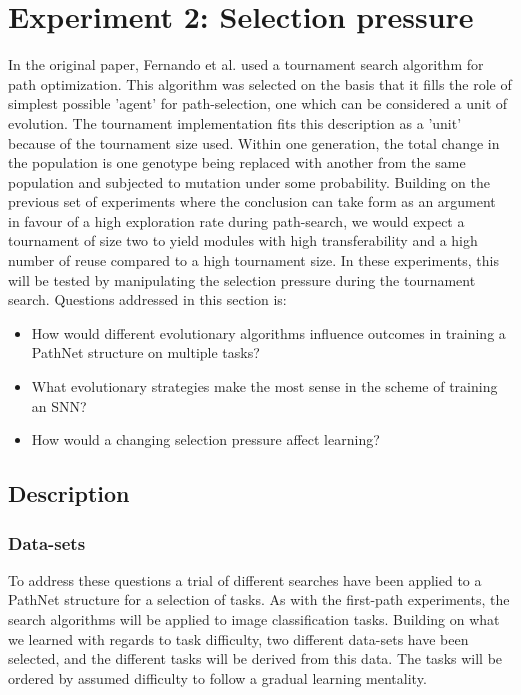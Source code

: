 \chapter{Experiment 2: Selection pressure}\label{exp2}
In the original paper, Fernando et al. used a tournament search algorithm for path optimization. This algorithm was selected on the basis that it fills the role of simplest possible 'agent' for path-selection, one which can be considered a unit of evolution.  The tournament implementation fits this description as a 'unit' because of the tournament size used. Within one generation, the total change in the population is one genotype being replaced with another from the same population and subjected to mutation under some probability. Building on the previous set of experiments where the conclusion can take form as an argument in favour of a high exploration rate during path-search, we would expect a tournament of size two to yield modules with high transferability and a high number of reuse compared to a high tournament size. In these experiments, this will be tested by manipulating the selection pressure during the tournament search. Questions addressed in this section is: 
\begin{itemize}
    \item How would different evolutionary algorithms influence outcomes in training a PathNet structure on multiple tasks?
    \item What evolutionary strategies make the most sense in the scheme of training an SNN?
    \item How would a changing selection pressure affect learning? 
\end{itemize}

\section{Description}\label{Search-datasets}
\subsection{Data-sets} \label{exp2:datasets}
To address these questions a trial of different searches have been applied to a PathNet structure for a selection of tasks. As with the first-path experiments, the search algorithms will be applied to image classification tasks. Building on what we learned with regards to task difficulty, two different data-sets have been selected, and the different tasks will be derived from this data. The tasks will be ordered by assumed difficulty to follow a gradual learning mentality. 


